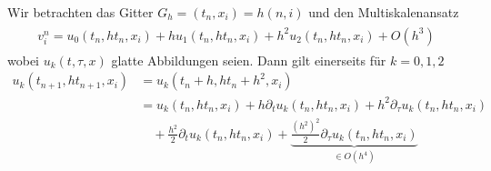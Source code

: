
Wir betrachten das Gitter $G_h = (t_n, x_i) = h (n, i)$ und den Multiskalenansatz
\begin{align}
\begin{split}
v^n_i = u_0(t_n, h t_n, x_i) + h u_1(t_n, h t_n, x_i) + h^2 u_2(t_n, h t_n, x_i) + O(h^3)
\end{split}
\end{align}
wobei $u_k(t, \tau, x)$ glatte Abbildungen seien.
Dann gilt einerseits für $k = 0,1,2$
\begin{align}
u_k(t_{n+1}, h t_{n+1}, x_i)
&= u_k(t_n + h, h t_n + h^2,  x_i)\\
&= u_k(t_n, h t_n, x_i) + h \partial_t u_k(t_n, h t_n, x_i) + h^2 \partial_\tau u_k(t_n, h t_n, x_i)\\
&\quad + \frac{h^2}{2} \partial_t u_k(t_n, h t_n, x_i) + \underbrace{\frac{\left(h^2\right)^2}{2} \partial_\tau u_k(t_n, h t_n, x_i)}_{\in O(h^4)}
\end{align}